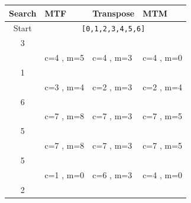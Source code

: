 \documentclass{article}[12pt]
\begin{document}
\begin{tabular}{|c|p{3.2cm}|p{3.2cm}|p{3.2cm}|}
\hline
Search & MTF & Transpose & MTM\\
\hline
\hline
Start&
\multicolumn{3}{|c|}{\tt [0,1,2,3,4,5,6]}\\
\hline
\hline
3&
&
&
\\
&
c=4 \hspace{.5cm}, m=5 \hspace{.5cm} &
c=4 \hspace{.5cm}, m=3 \hspace{.5cm} &
c=4 \hspace{.5cm}, m=0 \hspace{.5cm} \\
\hline
1&
&
&
\\
&
c=3 \hspace{.5cm}, m=4 \hspace{.5cm} &
c=2 \hspace{.5cm}, m=3 \hspace{.5cm} &
c=2 \hspace{.5cm}, m=4 \hspace{.5cm} \\
\hline
6&
&
&
\\
&
c=7 \hspace{.5cm}, m=8 \hspace{.5cm} &
c=7 \hspace{.5cm}, m=3 \hspace{.5cm} &
c=7 \hspace{.5cm}, m=5 \hspace{.5cm} \\
\hline
5&
&
&
\\
&
c=7 \hspace{.5cm}, m=8 \hspace{.5cm} &
c=7 \hspace{.5cm}, m=3 \hspace{.5cm} &
c=7 \hspace{.5cm}, m=5 \hspace{.5cm} \\
\hline
5&
&
&
\\
&
c=1 \hspace{.5cm}, m=0 \hspace{.5cm} &
c=6 \hspace{.5cm}, m=3 \hspace{.5cm} &
c=4 \hspace{.5cm}, m=0 \hspace{.5cm} \\
\hline
2&
&
&
\\

\end{tabular}
\end{document}
